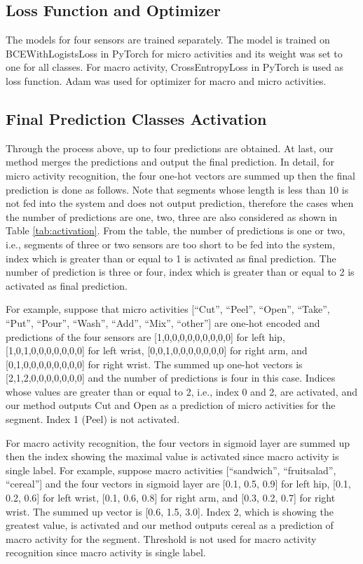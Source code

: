 \documentclass{svmult}
\begin{document}
\subsection{Loss Function and Optimizer}

The models for four sensors are trained separately. The model is trained on BCEWithLogistsLoss in PyTorch for micro activities and its weight was set to one for all classes. For macro activity, CrossEntropyLoss in PyTorch is used as loss function. Adam was used for optimizer for macro and micro activities. 

\subsection{Final Prediction Classes Activation}
Through the process above, up to four predictions are obtained. At last, our method merges the predictions and output the final prediction.
In detail, for micro activity recognition, the four one-hot vectors are summed up then the final prediction is done as follows. Note that segments whose length is less than 10 is not fed into the system and does not output prediction, therefore the cases when the number of predictions are one, two, three are also considered as shown in Table \ref{tab:activation}. From the table, the number of predictions is one or two, i.e., segments of three or two sensors are too short to be fed into the system, index which is greater than or equal to 1 is activated as final prediction. The number of prediction is three or four, index which is greater than or equal to 2 is activated as final prediction. 

For example, suppose that micro activities [``Cut'', ``Peel'', ``Open'', ``Take'', ``Put'', ``Pour'', ``Wash'', ``Add'', ``Mix'', ``other''] are one-hot encoded and predictions of the four sensors are [1,0,0,0,0,0,0,0,0,0] for left hip, [1,0,1,0,0,0,0,0,0,0] for left wrist, [0,0,1,0,0,0,0,0,0,0] for right arm, and [0,1,0,0,0,0,0,0,0,0] for right wrist. The summed up one-hot vectors is [2,1,2,0,0,0,0,0,0,0] and the number of predictions is four in this case. Indices whose values are greater than or equal to 2, i.e., index 0 and 2, are activated, and our method outputs Cut and Open as a prediction of micro activities for the segment. Index 1 (Peel) is not activated.

For macro activity recognition, the four vectors in sigmoid layer are summed up then the index showing the maximal value is activated since macro activity is single label. For example, suppose macro activities [``sandwich'', ``fruitsalad'', ``cereal''] and the four vectors in sigmoid layer are [0.1, 0.5, 0.9] for left hip, [0.1, 0.2, 0.6] for left wrist, [0.1, 0.6, 0.8] for right arm, and [0.3, 0.2, 0.7] for right wrist. The summed up vector is [0.6, 1.5, 3.0]. Index 2, which is showing the greatest value, is activated and our method outputs cereal as a prediction of macro activity for the segment. Threshold is not used for macro activity recognition since macro activity is single label.
\end{document}

